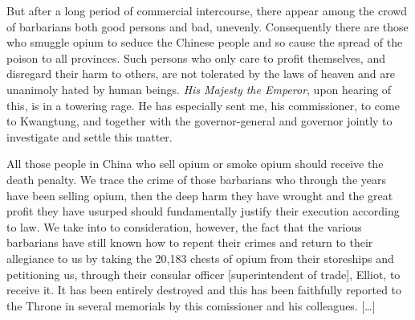 \begin{fancyquote}
        [\ldots] But after a long period of commercial intercourse, there appear
        among the crowd of barbarians both good persons and bad, unevenly.
        Consequently there are those who smuggle opium to seduce the Chinese
        people and so cause the spread of the poison to all provinces. Such
        persons who only care to profit themselves, and disregard their harm to
        others, are not tolerated by the laws of heaven and are unanimoly hated
        by human beings. \textit{His Majesty the Emperor}, upon hearing of this,
        is in a towering rage. He has especially sent me, his commissioner, to
        come to Kwangtung, and together with the governor-general and governor
        jointly to investigate and settle this matter.

        All those people in China who sell opium or smoke opium should receive
        the death penalty. We trace the crime of those barbarians who through
        the years have been selling opium, then the deep harm they have wrought
        and the great profit they have usurped should fundamentally justify
        their execution according to law. We take into to consideration,
        however, the fact that the various barbarians have still known how to
        repent their crimes and return to their allegiance to us by taking the
        20,183 chests of opium from their storeships and petitioning us, through
        their consular officer [superintendent of trade], Elliot, to receive it.
        It has been entirely destroyed and this has been faithfully reported to
        the Throne in several memorials by this comissioner and his colleagues.
        [\ldots]
	\begin{flushright}
		\autocite{Teng:1979}
	\end{flushright}
\end{fancyquote}
